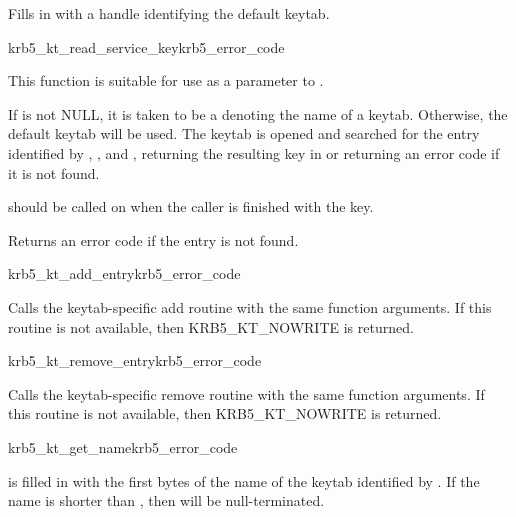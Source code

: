 Fills in  with  a handle identifying the default keytab.

\begin{funcdecl}{krb5_kt_read_service_key}{krb5_error_code}{\funcin}
\funcout
{}
\end{funcdecl}

This function is suitable for use as a parameter to
.

If  is not NULL, it is taken to be a
 denoting the name of a keytab.  Otherwise, the default
keytab will be used.
The keytab is opened and searched for the entry identified by
, , and , 
returning the resulting key
in  or returning an error code if it is not found. 

 should be called on  when
the caller is finished with the key.

Returns an error code if the entry is not found.

\begin{funcdecl}{krb5_kt_add_entry}{krb5_error_code}{\funcin}
\end{funcdecl}

Calls the keytab-specific add routine 
with the same function arguments.  If this routine is not available,
then KRB5_KT_NOWRITE is returned.

\begin{funcdecl}{krb5_kt_remove_entry}{krb5_error_code}{\funcin}
\end{funcdecl}

Calls the keytab-specific remove routine
 with the same function arguments.
If this routine is not available, then KRB5_KT_NOWRITE is returned.

\begin{funcdecl}{krb5_kt_get_name}{krb5_error_code}{\funcin}
\funcout
{}
\funcin
{}
\end{funcdecl}

 is filled in with the first  bytes of
the name of the keytab identified by .
If the name is shorter than , then 
will be null-terminated.

